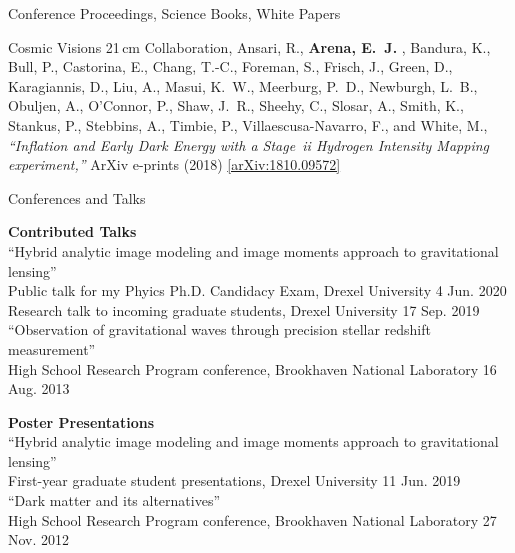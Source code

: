 \documentclass{resume} %
\newcommand{\forceindent}{\leavevmode{\parindent=1em\indent}}
\begin{document}
\begin{rSection}{Conference Proceedings, Science Books, White Papers}
\begin{etaremune}
\item {Cosmic Visions 21$\,$cm Collaboration}, {Ansari}, R., \textbf{{Arena}, E.~J.} , 
	{Bandura}, K., {Bull}, P., {Castorina}, E., {Chang}, T.-C., 
	{Foreman}, S., {Frisch}, J., {Green}, D., {Karagiannis}, D., 
	{Liu}, A., {Masui}, K.~W., {Meerburg}, P.~D., {Newburgh}, L.~B., 
	{Obuljen}, A., {O'Connor}, P., {Shaw}, J.~R., {Sheehy}, C., 
	{Slosar}, A., {Smith}, K., {Stankus}, P., {Stebbins}, A., 
	{Timbie}, P., {Villaescusa-Navarro}, F., and {White}, M., 
\textit{``Inflation and Early Dark Energy with a {Stage~{\sc ii}} Hydrogen Intensity Mapping experiment,''} ArXiv e-prints (2018) \href{https://arxiv.org/abs/1810.09572}{[arXiv:1810.09572]}

\end{etaremune}

\end{rSection}


\begin{rSection}{Conferences and Talks}

\textbf{Contributed Talks}\\
``Hybrid analytic image modeling and image moments approach to gravitational lensing''\\
\forceindent Public talk for my Phyics Ph.D. Candidacy Exam, Drexel University \hfill 4 Jun. 2020\\
\forceindent Research talk to incoming graduate students, Drexel University \hfill 17 Sep. 2019\\
``Observation of gravitational waves through precision stellar redshift measurement''\\
\forceindent High School Research Program conference, Brookhaven National Laboratory \hfill 16 Aug. 2013

\textbf{Poster Presentations}\\
``Hybrid analytic image modeling and image moments approach to gravitational lensing''\\
\forceindent First-year graduate student presentations, Drexel University \hfill 11 Jun. 2019\\
``Dark matter and its alternatives''\\
\forceindent High School Research Program conference, Brookhaven National Laboratory \hfill 27 Nov. 2012

\end{rSection}
\end{document}
